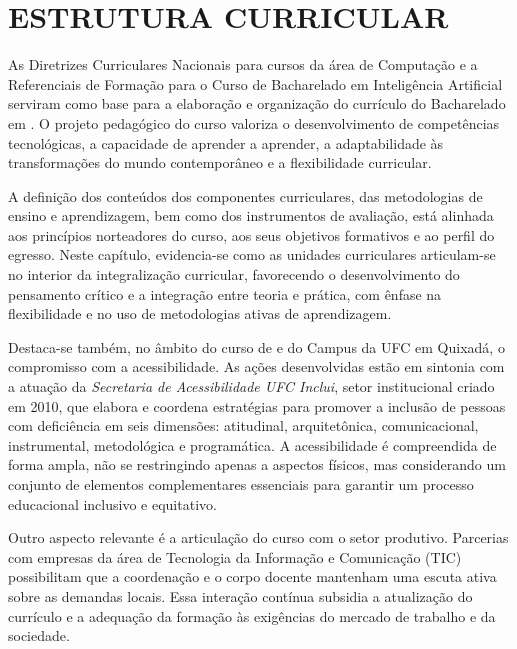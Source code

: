 \chapter{ESTRUTURA CURRICULAR}
\label{cap:estrutura-curricular}

As Diretrizes Curriculares Nacionais para cursos da área de Computação \cite{cne2001parecer9} e a Referenciais de Formação para o Curso de Bacharelado em Inteligência Artificial \cite{sbc2024} serviram como base para a elaboração e organização do currículo do Bacharelado em \nomedocurso. O projeto pedagógico do curso valoriza o desenvolvimento de competências tecnológicas, a capacidade de aprender a aprender, a adaptabilidade às transformações do mundo contemporâneo e a flexibilidade curricular.

A definição dos conteúdos dos componentes curriculares, das metodologias de ensino e aprendizagem, bem como dos instrumentos de avaliação, está alinhada aos princípios norteadores do curso, aos seus objetivos formativos e ao perfil do egresso. Neste capítulo, evidencia-se como as unidades curriculares articulam-se no interior da integralização curricular, favorecendo o desenvolvimento do pensamento crítico e a integração entre teoria e prática, com ênfase na flexibilidade e no uso de metodologias ativas de aprendizagem.

Destaca-se também, no âmbito do curso de \nomedocurso e do Campus da UFC em Quixadá, o compromisso com a acessibilidade. As ações desenvolvidas estão em sintonia com a atuação da \textit{Secretaria de Acessibilidade UFC Inclui}, setor institucional criado em 2010, que elabora e coordena estratégias para promover a inclusão de pessoas com deficiência em seis dimensões: atitudinal, arquitetônica, comunicacional, instrumental, metodológica e programática. A acessibilidade é compreendida de forma ampla, não se restringindo apenas a aspectos físicos, mas considerando um conjunto de elementos complementares essenciais para garantir um processo educacional inclusivo e equitativo.

Outro aspecto relevante é a articulação do curso com o setor produtivo. Parcerias com empresas da área de Tecnologia da Informação e Comunicação (TIC) possibilitam que a coordenação e o corpo docente mantenham uma escuta ativa sobre as demandas locais. Essa interação contínua subsidia a atualização do currículo e a adequação da formação às exigências do mercado de trabalho e da sociedade.

